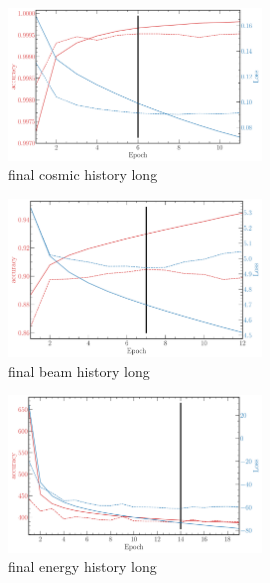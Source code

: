 \begin{figure} %
    \includegraphics[width=0.6\textwidth]{diagrams/7-cvn/chipsnet/final_cosmic_history.pdf}
    \caption[final cosmic history short]
    {final cosmic history long}
    \label{fig:final_cosmic_history}
\end{figure}

\begin{figure} %
    \includegraphics[width=0.6\textwidth]{diagrams/7-cvn/chipsnet/final_beam_history.pdf}
    \caption[final beam history short]
    {final beam history long}
    \label{fig:final_beam_history}
\end{figure}

\begin{figure} %
    \includegraphics[width=0.6\textwidth]{diagrams/7-cvn/chipsnet/final_energy_history.pdf}
    \caption[final energy history short]
    {final energy history long}
    \label{fig:final_energy_history}
\end{figure}

